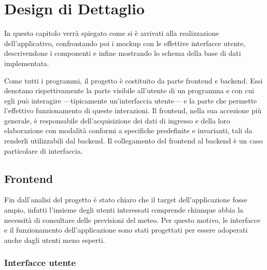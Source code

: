 \chapter{Design di Dettaglio}
In questo capitolo verrà spiegato come si è arrivati alla realizzazione dell’applicativo,
confrontando poi i mockup con le effettive interfacce utente, descrivendone i componenti e infine mostrando lo schema della base di dati implementata.

Come tutti i programmi, il progetto è costituito da parte frontend e backend.
Essi denotano rispettivamente la parte visibile all'utente di un programma e con cui egli può interagire —tipicamente un'interfaccia utente— e la parte che permette l'effettivo funzionamento di queste interazioni. Il frontend, nella sua accezione più generale, è responsabile dell'acquisizione dei dati di ingresso e della loro elaborazione con modalità conformi a specifiche predefinite e invarianti, tali da renderli utilizzabili dal backend. Il collegamento del frontend al backend è un caso particolare di interfaccia.
\section{Frontend}
Fin dall'analisi del progetto è stato chiaro che il target dell'applicazione fosse
ampio, infatti l'insieme degli utenti interessati comprende chiunque abbia la
necessità di consultare delle previsioni del meteo.
Per questo motivo, le interfacce e il funzionamento dell'applicazione sono
stati progettati per essere adoperati anche dagli utenti meno esperti.\\
\subsection{Interfacce utente}


